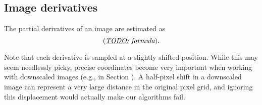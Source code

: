 \subsection{Image derivatives}
The partial derivatives of an image are estimated as
$$(\textit{\underline{TODO:} formula}).$$

Note that each derivative is sampled at a slightly shifted position.
While this may seem needlessly picky, precise coordinates become very important when working with downscaled images (e.g., in Section ).
A half-pixel shift in a downscaled image can represent a very large distance in the original pixel grid, and ignoring this displacement would actually make our algorithms fail.
